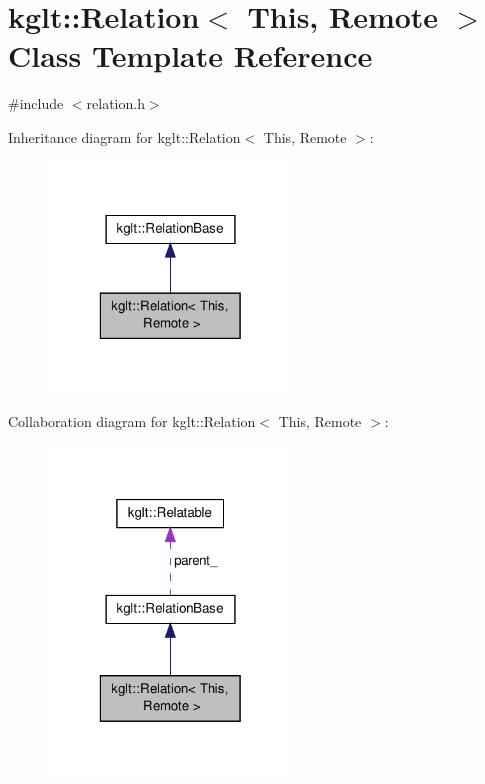 \hypertarget{classkglt_1_1_relation}{\section{kglt\-:\-:Relation$<$ This, Remote $>$ Class Template Reference}
\label{classkglt_1_1_relation}
}


{\ttfamily \#include $<$relation.\-h$>$}



Inheritance diagram for kglt\-:\-:Relation$<$ This, Remote $>$\-:\nopagebreak
\begin{figure}[H]
\begin{center}
\leavevmode
\includegraphics[width=184pt]{classkglt_1_1_relation__inherit__graph}
\end{center}
\end{figure}


Collaboration diagram for kglt\-:\-:Relation$<$ This, Remote $>$\-:\nopagebreak
\begin{figure}[H]
\begin{center}
\leavevmode
\includegraphics[width=184pt]{classkglt_1_1_relation__coll__graph}
\end{center}
\end{figure}
